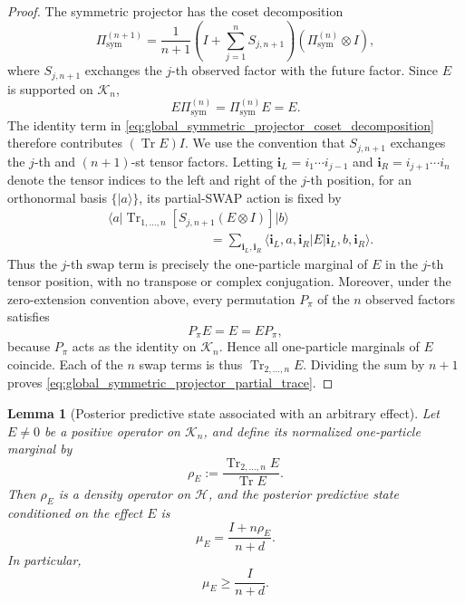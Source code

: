 \documentclass[journal]{IEEEtran}
\newtheorem{lemma}[theorem]{Lemma}
\newcommand{\ket}[1]{\lvert #1\rangle}
\newcommand{\bra}[1]{\langle #1\rvert}
\begin{document}
\begin{proof}
The symmetric projector has the coset decomposition
\begin{equation}
    \Pi_{\mathrm{sym}}^{(n+1)}
    =
    \frac{1}{n+1}
    \left(I+\sum_{j=1}^{n}S_{j,n+1}\right)
    \left(\Pi_{\mathrm{sym}}^{(n)}\otimes I\right),
    \label{eq:global_symmetric_projector_coset_decomposition}
\end{equation}
where \(S_{j,n+1}\) exchanges the \(j\)-th observed factor with the future
factor.  Since \(E\) is supported on \(\mathcal K_n\),
\[
    E\Pi_{\mathrm{sym}}^{(n)}
    =\Pi_{\mathrm{sym}}^{(n)}E=E.
\]
The identity term in \eqref{eq:global_symmetric_projector_coset_decomposition}
therefore contributes \((\operatorname{Tr}E)I\). We use the convention that
\(S_{j,n+1}\) exchanges the \(j\)-th and \((n+1)\)-st tensor factors. Letting 
\(\mathbf{i}_L = i_1 \cdots i_{j-1}\) and \(\mathbf{i}_R = i_{j+1} \cdots i_n\) 
denote the tensor indices to the left and right of the \(j\)-th position, 
for an orthonormal basis \(\{\ket a\}\), its partial-SWAP action is fixed by
\begin{align}
&\bra{a}\operatorname{Tr}_{1,\ldots,n}[S_{j,n+1}(E\otimes I)]\ket{b} \nonumber\\
&\qquad\qquad\qquad\qquad= \sum_{\mathbf{i}_L, \mathbf{i}_R} 
\langle \mathbf{i}_L, a, \mathbf{i}_R \rvert E \lvert \mathbf{i}_L, b, \mathbf{i}_R \rangle.
\label{eq:global_partial_swap_matrix_element}
\end{align}
Thus the \(j\)-th swap term is precisely the one-particle marginal of
\(E\) in the \(j\)-th tensor position, with no transpose or complex
conjugation. Moreover, under the zero-extension convention above, every permutation
\(P_\pi\) of the \(n\) observed factors satisfies
\[
    P_\pi E=E=EP_\pi,
\]
because \(P_\pi\) acts as the identity on \(\mathcal K_n\). Hence all
one-particle marginals of \(E\) coincide. Each of the \(n\) swap terms is thus
\(\operatorname{Tr}_{2,\ldots,n}E\). Dividing the sum by \(n+1\) proves
\eqref{eq:global_symmetric_projector_partial_trace}.
\end{proof}

\begin{lemma}[Posterior predictive state associated with an arbitrary effect]
\label{lem:global_arbitrary_effect_posterior}
Let \(E\ne0\) be a positive operator on \(\mathcal K_n\), and define its
normalized one-particle marginal by
\begin{equation}
    \rho_E
    :=
    \frac{\operatorname{Tr}_{2,\ldots,n}E}{\operatorname{Tr}E}.
    \label{eq:global_effect_one_particle_marginal}
\end{equation}
Then \(\rho_E\) is a density operator on \(\mathcal H\), and the posterior
predictive state conditioned on the effect \(E\) is
\begin{equation}
    \mu_E
    =
    \frac{I+n\rho_E}{n+d}.
    \label{eq:global_arbitrary_effect_posterior}
\end{equation}
In particular,
\begin{equation}
    \mu_E\ge\frac{I}{n+d}.
    \label{eq:global_arbitrary_effect_spectral_floor}
\end{equation}
\end{lemma}
\end{document}
